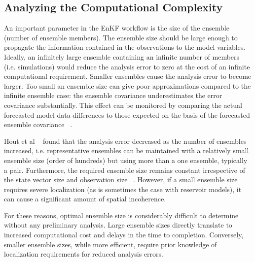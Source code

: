 \documentclass{acm_proc_article-sp}
\begin{document}
\subsection{Analyzing the Computational Complexity}



An important parameter in the EnKF workflow is the size of the
ensemble (number of ensemble members). The ensemble size should be
large enough to propagate the information contained in the
observations to the model variables. Ideally, an infinitely large ensemble containing
an infinite number of members (i.e. simulations) would reduce the analysis
error to zero at the cost of an infinite computational requirement. Smaller ensembles cause the
analysis error to become larger. Too small an ensemble size can give
poor approximations compared to the infinite ensemble case: the ensemble
covariance underestimates the error covariance substantially. This
effect can be monitored by comparing the actual forecasted model data
differences to those expected on the basis of the forecasted ensemble
covariance ~\cite{Burger98}.

Hout et al ~\cite{Hout98} found that the analysis error
decreased as the number of ensembles increased, i.e. representative
ensembles can be maintained with a relatively small ensemble size
(order of hundreds) but using more than a one ensemble, typically a pair. Furthermore, the
required ensemble size remains constant irrespective of the state
vector size and observation size ~\cite{Mitchell02}. However, if a
small ensemble size requires severe localization (as is sometimes the
case with reservoir models), it can cause a significant amount of
spatial incoherence.

For these reasons, optimal ensemble size is considerably difficult to
determine without any preliminary analysis. Large ensemble sizes
directly translate to increased computational cost and delays in the
time to completion. Conversely, smaller ensemble sizes, while more
efficient, require prior knowledge of localization requirements for
reduced analysis errors.
\end{document}

